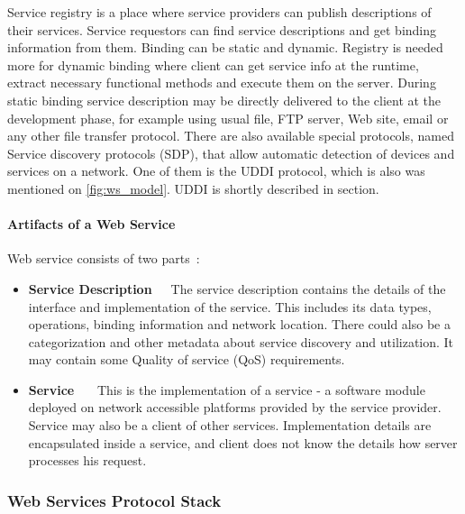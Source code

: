 Service registry is a place where service providers can publish
descriptions of their services. Service requestors can find service descriptions
and get binding information from them. Binding can be static and dynamic.
Registry is needed more for dynamic binding where client can get service info at
the runtime, extract necessary functional methods and execute them on the
server. During static binding service description may be directly delivered to
the client at the development phase, for example using usual file, \gls{FTP}
server, Web site, email or any other file transfer protocol.
There are also available special protocols, named Service discovery protocols
(SDP), that allow automatic detection of devices and services on a network. One
of them is the \gls{UDDI} protocol, which is also was mentioned on
\autoref{fig:ws_model}. \gls{UDDI} is shortly described in
 section.

\paragraph{\textbf{Artifacts of a Web Service}}
\newline
Web service consists of two parts~\cite{Kreger2001-WSC}:
\begin{itemize} 
\item \label{itm:service_description_artifact} 
\textbf{Service Description}~~~The
service description contains the details of the interface and implementation of the service. This includes its data types, operations, binding
information and network location. There could also be a categorization and
other metadata about service discovery and utilization. It may contain some
Quality of service (QoS) requirements. 

 \item \textbf{Service}
 ~~~This is the implementation of a service - a software module deployed on network accessible platforms provided by the service provider.
 Service may also be a client of other services. Implementation details
 are encapsulated inside a service, and client does not know the details how
 server processes his request.
\end{itemize}



\subsubsection{Web Services Protocol Stack}
\label{sec:ws_protocol_stack}

